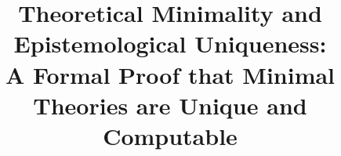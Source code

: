 \documentclass[11pt]{article}
\title{Theoretical Minimality and Epistemological Uniqueness:\\
A Formal Proof that Minimal Theories are Unique and Computable}
\begin{document}
\maketitle
\paperfooter

\begin{abstract}

\end{abstract}












\nocite{*}


\end{document}

